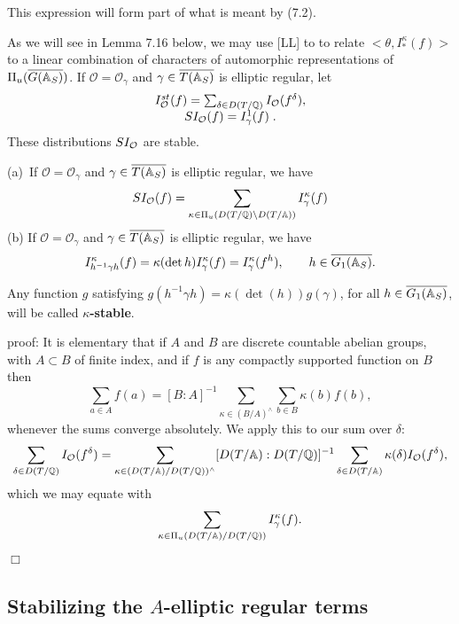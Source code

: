 This expression will form part of what is meant by (7.2).

As we will see in Lemma 7.16 below,
we may use [LL] to to relate $<\theta,I_{*}^\kappa (f)>$ to
a linear combination of characters of automorphic representations of
$\Pi_u(\overline{G(\mathbb{A} _S)})$. If $\mathcal{O}=\mathcal{O}_\gamma $
and $\gamma \in \overline{T(\mathbb{A} _S)}$ is elliptic regular, let 
\begin{equation}
\begin{array}{c}
I^{st}_{\cal{O}}(f)=\sum_{\delta\in D(T/\mathbb{Q} )}
I_{\cal{O}}(f^\delta),\\
SI_{\cal{O}}(f)=I^1_{\gamma}(f)\; .
\end{array}
\end{equation}
These distributions $SI_{\cal{O}}$ are stable.

\begin{lemma}
(a)\ If $\mathcal{O}=\mathcal{O}_\gamma $ and
$\gamma \in \overline{T(\mathbb{A} _S)}$ is
elliptic regular, we have 
\[
SI_{\mathcal{O}}(f)
=\sum_{\kappa \in \Pi _u(D(T/{\Bbb Q})\backslash D(T/\mathbb{A} ))}
I_\gamma ^\kappa (f)
\]
(b) If $\mathcal{O}=\mathcal{O}_\gamma $ and
$\gamma \in \overline{T(\mathbb{A} _S)}$ is elliptic regular, we have 
\[
I_{h^{-1}\gamma h}^\kappa (f)=\kappa (\det h)I_\gamma ^\kappa (f)=I_\gamma
^\kappa (f^h),\ \ \ \ \ \ h\in \overline{G_1(\mathbb{A} _S)}.
\]
\end{lemma}

Any function $g$ satisfying $g(h^{-1}\gamma h)=\kappa (\det (h))g(\gamma )$,
for all $h\in \overline{G_1(\mathbb{A} _S)}$, will be called
\textbf{$\kappa $-stable}.

proof: It is elementary that if $A$ and $B$ are
discrete countable abelian groups, with $A\subset B$ of finite
index, and if $f$ is any compactly supported function on $B$ then 
\begin{equation}
\sum_{a\in A}f(a)=[B:A]^{-1}\sum_{\kappa \in (B/A)^{\wedge }}\sum_{b\in
B}\kappa (b)f(b),
\end{equation}
whenever the sums converge absolutely. We apply this to our sum over $\delta 
$: 
\[
\sum_{\delta \in D(T/\mathbb{Q} )}
I_{\cal{O}}(f^\delta)
=
\sum_{\kappa \in (D(T/\mathbb{A} )/D(T/\mathbb{Q} ))^{\wedge}}
[D(T/\mathbb{A} ):D(T/\mathbb{Q} )]^{-1}
\sum_{\delta \in D(T/\mathbb{A} )}
\kappa (\delta )I_{\cal{O}}(f^\delta),
\]
which we may equate with
\begin{equation}
\sum_{\kappa \in \Pi_u(D(T/\mathbb{A} )/D(T/\mathbb{Q} ))}
I^\kappa_\gamma (f).
\end{equation}
$\Box$

\subsection{Stabilizing the $A$-elliptic regular terms}

